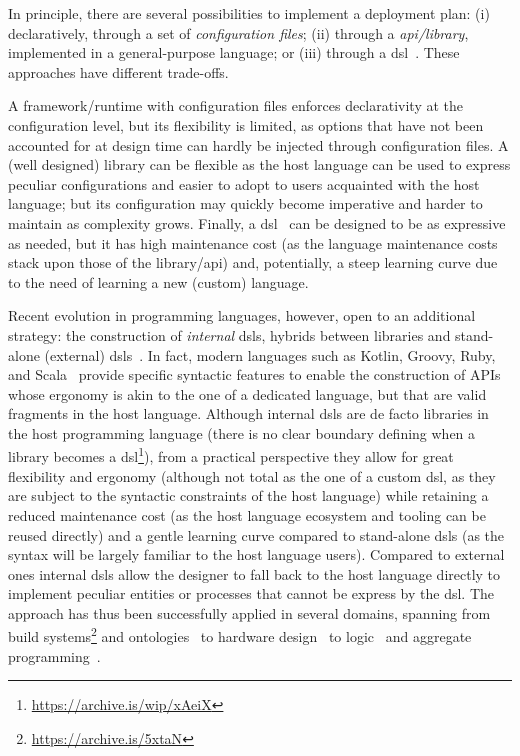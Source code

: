 \documentclass[conference]{IEEEtran}
\begin{document}
In principle, there are several possibilities to implement a deployment plan:
%
(i) declaratively, through a set of \emph{configuration files};
(ii) through a \emph{\ac{api}/library}, implemented in a general-purpose language;
or 
(iii) through a \ac{dsl}~\cite{dsl-book-voelter}. %
%
These approaches have different trade-offs.

A framework/runtime with configuration files enforces declarativity at the configuration level,
but its flexibility is limited,
as options that have not been accounted for at design time can hardly be injected through configuration files.
%
A (well designed) library can be flexible as the host language can be used to express peculiar configurations
and easier to adopt to users acquainted with the host language;
but its configuration may quickly become imperative and harder to maintain as complexity grows.
%
Finally, a \ac{dsl}~\cite{dsl-book-voelter} can be designed to be as expressive as needed,
but it has high maintenance cost (as the language maintenance costs stack upon those of the library/\ac{api}) and, potentially,
a steep learning curve due to the need of learning a new (custom) language.

Recent evolution in programming languages,
however,
open to an additional strategy:
the construction of \emph{internal} \acp{dsl},
hybrids between libraries and stand-alone (external) \acp{dsl}~\cite{dsl-book-voelter}.
%
In fact, modern languages such as Kotlin, Groovy, Ruby, and Scala~\cite{Riti2018}
provide specific syntactic features to enable the construction of APIs whose ergonomy is akin to the one of a dedicated language,
but that are valid fragments in the host language.
%
Although internal \acp{dsl} are de facto libraries in the host programming language
(there is no clear boundary defining when a library becomes a \ac{dsl}\footnote{\url{https://archive.is/wip/xAeiX}}),
from a practical perspective
they allow for great flexibility and ergonomy
(although not total as the one of a custom \ac{dsl}, as they are subject to the syntactic constraints of the host language)
while retaining a reduced maintenance cost
(as the host language ecosystem and tooling can be reused directly)
and a gentle learning curve compared to stand-alone \acp{dsl}
(as the syntax will be largely familiar to the host language users).
%
Compared to external ones
internal \acp{dsl} allow the designer to fall back to the host language directly
to implement peculiar entities or processes that cannot be express by the \ac{dsl}.
%
The approach has thus been successfully applied in several domains,
spanning from
build systems\footnote{\url{https://archive.is/5xtaN}}
and ontologies~\cite{DBLP:journals/jossw/Balhoff16} to
hardware design~\cite{DBLP:journals/trets/SerreP20} to
logic~\cite{2pkt-swx16} and aggregate programming~\cite{DBLP:journals/softx/CasadeiVAP22}.
%
\end{document}
